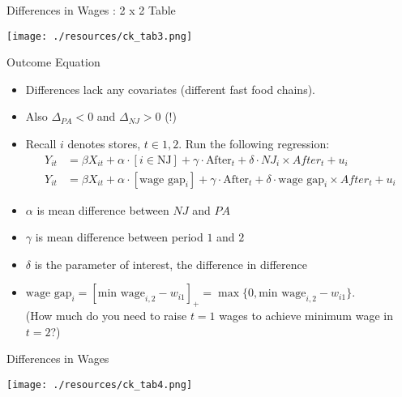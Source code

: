 \begin{frame}{Differences in Wages : 2 x 2 Table}
\begin{center}
\texttt{[image: ./resources/ck\_tab3.png]}
\end{center}
\end{frame}

\begin{frame}{Outcome Equation}
\begin{itemize}
\item Differences lack any covariates (different fast food chains).
\item Also $\Delta_{PA}<0$ and $\Delta_{NJ} > 0$ (!)
\item Recall $i$ denotes stores, $t \in {1,2}$. Run the following regression:
\begin{align*}
Y_{it}&=\beta X_{it} +\alpha \cdot [i \in \text{NJ}] +  \gamma \cdot \text{After}_{t}  + \delta \cdot NJ_i \times After_{t} +u_{i}\\
Y_{it}&=\beta X_{it} +\alpha \cdot [\text{wage gap}_{i}] +  \gamma \cdot \text{After}_{t}  + \delta \cdot \text{wage gap}_{i} \times After_{t} +u_{i}
\end{align*}
\item $\alpha$ is mean difference between $NJ$ and $PA$
\item $\gamma$ is mean difference between period $1$ and $2$
\item $\delta$ is the parameter of interest, the \alert{difference in difference}
\item $\text{wage gap}_{i} = [\text{min wage}_{i,2}-w_{i1} ]_{+} =\max\{0, \text{min wage}_{i,2}-w_{i1}\} $.\\
 (How much do you need to raise $t=1$ wages to achieve minimum wage in $t=2$?)
\end{itemize}
\end{frame}

\begin{frame}{Differences in Wages}
\begin{center}
\texttt{[image: ./resources/ck\_tab4.png]}
\end{center}
\end{frame}


